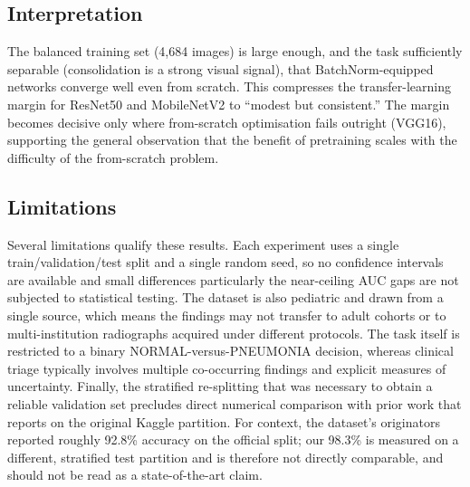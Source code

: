 \documentclass[11pt,a4paper]{article}
\numberwithin{figure}{section}
\numberwithin{table}{section}
\begin{document}
\subsection{Interpretation}
The balanced training set (4{,}684 images) is large enough, and the task sufficiently separable
(consolidation is a strong visual signal), that BatchNorm-equipped networks converge well even from
scratch. This compresses the transfer-learning margin for ResNet50 and MobileNetV2 to ``modest but
consistent.'' The margin becomes decisive only where from-scratch optimisation fails outright (VGG16),
supporting the general observation that the benefit of pretraining scales with the difficulty of the
from-scratch problem.

\subsection{Limitations}
\label{sec:limits}
Several limitations qualify these results. Each experiment uses a single train/validation/test split and
a single random seed, so no confidence intervals are available and small differences particularly the
near-ceiling AUC gaps are not subjected to statistical testing. The dataset is also pediatric and drawn
from a single source, which means the findings may not transfer to adult cohorts or to multi-institution
radiographs acquired under different protocols. The task itself is restricted to a binary
NORMAL-versus-PNEUMONIA decision, whereas clinical triage typically involves multiple co-occurring
findings and explicit measures of uncertainty. Finally, the stratified re-splitting that was necessary to
obtain a reliable validation set precludes direct numerical comparison with prior work that reports on
the original Kaggle partition. For context, the dataset's originators \cite{kermany} reported roughly
92.8\% accuracy on the official split; our 98.3\% is measured on a different, stratified test partition
and is therefore not directly comparable, and should not be read as a state-of-the-art claim.
\end{document}
